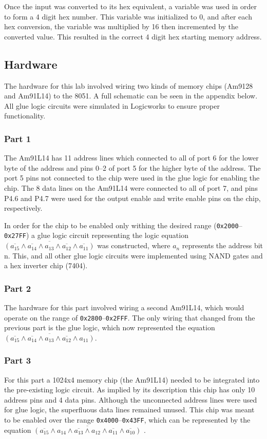 \documentclass[12pt]{article}
\begin{document}
Once the input was converted to its hex equivalent, a variable was used in order to form a 4 digit hex number. This variable was initialized to 0, and after each hex conversion, the variable was multiplied by 16 then incremented by the converted value. This resulted in the correct 4 digit hex starting memory address. 

\subsection{Hardware}
The hardware for this lab involved wiring two kinds of memory chips (Am9128 and Am91L14) to the 8051. A full schematic can be seen in the appendix below. All glue logic circuits were simulated in Logicworks to ensure proper functionality. 

\subsubsection{Part 1}
The Am91L14 has 11 address lines which connected to all of port 6 for the lower byte of the address and pins 0--2 of port 5 for the higher byte of the address. The port 5 pins not connected to the chip were used in the glue logic for enabling the chip. The 8 data lines on the Am91L14 were connected to all of port 7, and pins P4.6 and P4.7 were used for the output enable and write enable pins on the chip, respectively. 

In order for the chip to be enabled only withing the desired range (\texttt{0x2000}--\texttt{0x27FF}) a glue logic circuit representing the logic equation $\overline{(\overline{a_{15}}\land\overline{a_{14}}\land a_{13}\land\overline{a_{12}}\land\overline{a_{11}})}$ was constructed, where $a_n$ represents the address bit n. This, and all other glue logic circuits were implemented using NAND gates and a hex inverter chip (7404).

\subsubsection{Part 2}
The hardware for this part involved wiring a second Am91L14, which would operate on the range of \texttt{0x2800}--\texttt{0x2FFF}. The only wiring that changed from the previous part is the glue logic, which now represented the equation $\overline{(\overline{a_{15}}\land\overline{a_{14}}\land a_{13}\land\overline{a_{12}}\land a_{11})}$.

\subsubsection{Part 3}
For this part a 1024x4 memory chip (the Am91L14) needed to be integrated into the pre-existing logic circuit. As implied by its description this chip has only 10 address pins and 4 data pins. Although the unconnected address lines were used for glue logic, the superfluous data lines remained unused. This chip was meant to be enabled over the range \texttt{0x4000}--\texttt{0x43FF}, which can be represented by the equation  $\overline{(\overline{a_{15}}\land a_{14}\land \overline{a_{13}}\land a_{12}\land\overline{a_{11}}\land\overline{a_{10}})}$ .
\end{document}
